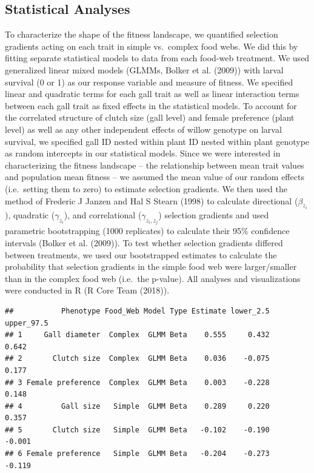 \documentclass[]{elsarticle} %
\begin{document}
\subsection{Statistical Analyses}\label{statistical-analyses}

To characterize the shape of the fitness landscape, we quantified
selection gradients acting on each trait in simple vs.~complex food
webs. We did this by fitting separate statistical models to data from
each food-web treatment. We used generalized linear mixed models (GLMMs,
Bolker et al. (2009)) with larval survival (0 or 1) as our response
variable and measure of fitness. We specified linear and quadratic terms
for each gall trait as well as linear interaction terms between each
gall trait as fixed effects in the statistical models. To account for
the correlated structure of clutch size (gall level) and female
preference (plant level) as well as any other independent effects of
willow genotype on larval survival, we specified gall ID nested within
plant ID nested within plant genotype as random intercepts in our
statistical models. Since we were interested in characterizing the
fitness landscape -- the relationship between mean trait values and
population mean fitness -- we assumed the mean value of our random
effects (i.e.~setting them to zero) to estimate selection gradients. We
then used the method of Frederic J Janzen and Hal S Stearn (1998) to
calculate directional (\(\beta_{z_i}\)), quadratic (\(\gamma_{z_i}\)),
and correlational (\(\gamma_{z_i,z_j}\)) selection gradients and used
parametric bootstrapping (1000 replicates) to calculate their 95\%
confidence intervals (Bolker et al. (2009)). To test whether selection
gradients differed between treatments, we used our bootstrapped
estimates to calculate the probability that selection gradients in the
simple food web were larger/smaller than in the complex food web
(i.e.~the p-value). All analyses and visualizations were conducted in R
(R Core Team (2018)).

\begin{verbatim}
##           Phenotype Food_Web Model Type Estimate lower_2.5 upper_97.5
## 1     Gall diameter  Complex  GLMM Beta    0.555     0.432      0.642
## 2       Clutch size  Complex  GLMM Beta    0.036    -0.075      0.177
## 3 Female preference  Complex  GLMM Beta    0.003    -0.228      0.148
## 4         Gall size   Simple  GLMM Beta    0.289     0.220      0.357
## 5       Clutch size   Simple  GLMM Beta   -0.102    -0.190     -0.001
## 6 Female preference   Simple  GLMM Beta   -0.204    -0.273     -0.119
\end{verbatim}
\end{document}
